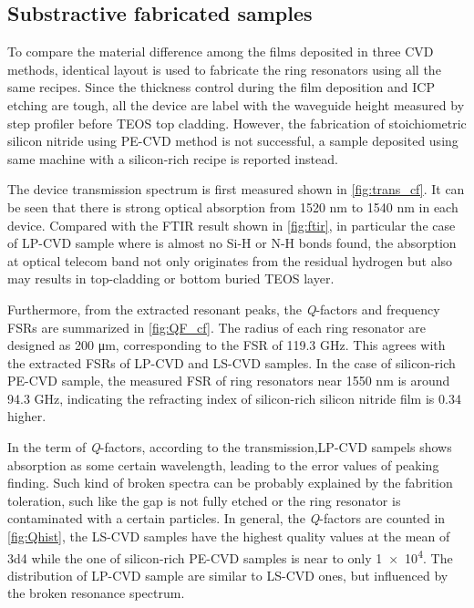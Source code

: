 \subsection{Substractive fabricated samples}

To compare the material difference among the films deposited in three CVD methods, identical layout is used to fabricate the ring resonators using all the same recipes. %
Since the thickness control during the film deposition and ICP etching are tough, all the device are label with the waveguide height measured by step profiler before TEOS top cladding. However, the fabrication of stoichiometric silicon nitride using PE-CVD method is not successful, a sample deposited using same machine with a silicon-rich recipe is reported instead.

The device transmission spectrum is first measured shown in \autoref{fig:trans_cf}. It can be seen that there is strong optical absorption from 1520 nm to 1540 nm in each device. Compared with the FTIR result shown in \autoref{fig:ftir}, in particular the case of LP-CVD sample where is almost no Si-H or N-H bonds found, the absorption at optical telecom band not only originates from the residual hydrogen but also may results in top-cladding or bottom buried TEOS layer.

Furthermore, from the extracted resonant peaks, the \textit{Q}-factors and frequency FSRs are summarized in \autoref{fig:QF_cf}. The radius of each ring resonator are designed as 200 \si{\um}, corresponding to the FSR of 119.3 GHz. This agrees with the extracted FSRs of LP-CVD and LS-CVD samples. In the case of silicon-rich PE-CVD sample, the measured FSR of ring resonators near 1550 nm is around 94.3 GHz, indicating the refracting index of silicon-rich silicon nitride film is 0.34 higher.

In the term of \textit{Q}-factors, according to the transmission,LP-CVD sampels shows absorption as some certain wavelength, leading to the error values of peaking finding. Such kind of broken spectra can be probably explained by the fabrition toleration, such like the gap is not fully etched or the ring resonator is contaminated with a certain particles. In general, the \textit{Q}-factors are counted in \autoref{fig:Qhist}, the LS-CVD samples have the highest quality values at the mean of \num{3d4} while the one of silicon-rich PE-CVD samples is near to only \num{1e4}. The distribution of LP-CVD sample are similar to LS-CVD ones, but influenced by the broken resonance spectrum.

